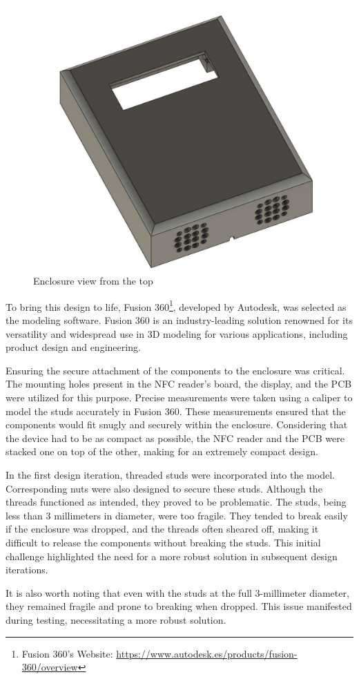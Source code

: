 \begin{figure}[h]
	\centering
	\includegraphics[width = .5\textwidth]{Imagenes/Vectorial/enclosure_front.pdf}
	\caption{Enclosure view from the top}
	\label{fig:enclosure_front}
\end{figure}

To bring this design to life, Fusion 360\footnote{Fusion 360's Website: 
\url{https://www.autodesk.es/products/fusion-360/overview}}, developed by Autodesk, was selected 
as the modeling software. Fusion 360 is an industry-leading solution renowned for its versatility 
and widespread use in 3D modeling for various applications, including product design and 
engineering.

Ensuring the secure attachment of the components to the enclosure was critical. The mounting holes 
present in the NFC reader's board, the display, and the PCB were utilized for this purpose. 
Precise measurements were taken using a caliper to model the studs accurately in Fusion 360. These 
measurements ensured that the components would fit snugly and securely within the enclosure.
Considering that the device had to be as compact as possible, the NFC reader and the PCB were 
stacked one on top of the other, making for an extremely compact design.

In the first design iteration, threaded studs were incorporated into the model. Corresponding nuts 
were also designed to secure these studs. Although the threads functioned as intended, they proved 
to be problematic. The studs, being less than 3 millimeters in diameter, were too fragile. They 
tended to break easily if the enclosure was dropped, and the threads often sheared off, making it 
difficult to release the components without breaking the studs. This initial challenge highlighted 
the need for a more robust solution in subsequent design iterations.

It is also worth noting that even with the studs at the full 3-millimeter diameter, they remained 
fragile and prone to breaking when dropped. This issue manifested during testing, necessitating a 
more robust solution.

